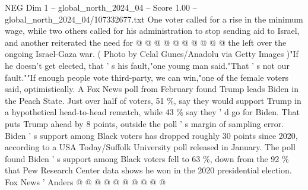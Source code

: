 \begin{textsample}{NEG Dim 1 – global\_north\_2024\_04 – Score 1.00 – global\_north\_2024\_04/107332677.txt}
One voter called for a rise in the minimum wage, while two others called for his administration to stop sending aid to Israel, and another reiterated the need for @ @ @ @ @ @ @ @ @ @ the left over the ongoing Israel-Gaza war. ( Photo by Celal Gunes/Anadolu via Getty Images )"If he doesn't get elected, that ' s his fault,"one young man said."That ' s not our fault.""If enough people vote third-party, we can win,"one of the female voters said, optimistically.
A Fox News poll from February found Trump leads Biden in the Peach State.
Just over half of voters, 51 \%, say they would support Trump in a hypothetical head-to-head rematch, while 43 \% say they ' d go for Biden.
That puts Trump ahead by 8 points, outside the poll ' s margin of sampling error.
Biden ' s support among Black voters has dropped roughly 30 points since 2020, according to a USA Today/Suffolk University poll released in January.
The poll found Biden ' s support among Black voters fell to 63 \%, down from the 92 \% that Pew Research Center data shows he won in the 2020 presidential election.
Fox News ' Anders @ @ @ @ @ @ @ @ @ @

\end{textsample}
